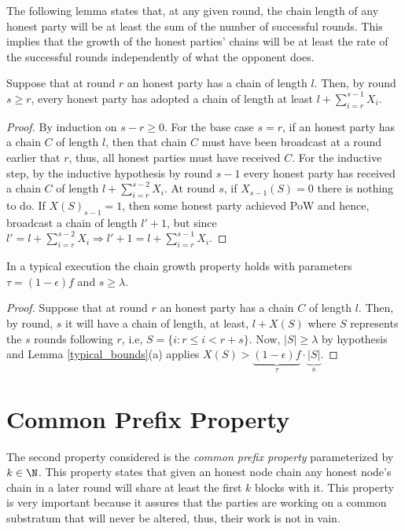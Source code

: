 \documentclass[..]{subfiles}
\begin{document}
The following lemma states that, at any given round, the chain length of any honest party will be at least the sum of the number of successful rounds. This implies that the growth of the honest parties' chains will be at least the rate of the successful rounds independently of what the opponent does.
\begin{lemma}\label{cg_lemma}
	Suppose that at round $r$ an honest party has a chain of length $l$. Then, by round $s \ge r$, every honest party has adopted a chain of length at least $l + \sum_{i=r}^{s-1}{X_i}$.
\end{lemma}
\begin{proof}
	By induction on $s-r \ge 0$. For the base case $s=r$, if an honest party has a chain $C$ of length $l$, then that chain $C$ must have been broadcast at a round earlier that $r$, thus, all honest parties must have received $C$.
	For the inductive step, by the inductive hypothesis by round $s-1$ every honest party has received a chain $C$ of length $l + \sum_{i=r}^{s-2}{X_i}$. At round $s$, if $X_{s-1}(S) = 0$ there is nothing to do. If $X(S)_{s-1} = 1$, then some honest party achieved PoW and hence, broadcast a chain of length $l' + 1$, but since $l' = l + \sum_{i=r}^{s-2}{X_i} \Rightarrow l' + 1 = l + \sum_{i=r}^{s-1}{X_i}$.
\end{proof}

\begin{theorem}
	In a typical execution the chain growth property holds with parameters $\tau = (1 - \epsilon)f$ and $s \ge \lambda$.
\end{theorem}
\begin{proof}
	Suppose that at round $r$ an honest party has a chain $C$ of length $l$. Then, by round, $s$ it will have a chain of length, at least, $l + X(S)$ where $S$ represents the $s$ rounds following $r$, i.e, $S = \{i: r \le i < r+s\}$. Now, $|S| \ge \lambda$ by hypothesis and Lemma \ref{typical_bounds}(a) applies $X(S) > \underbrace{(1-\epsilon)f}_\text{$\tau$} \cdot \underbrace{|S|}_\text{s}$.
\end{proof}




\section{Common Prefix Property}

The second property considered is the \textit{common prefix property} parameterized by $k \in \N$. This property states that given an honest node chain any honest node's chain in a later round will share at least the first $k$ blocks with it. This property is very important because it assures that the parties are working on a common substratum that will never be altered, thus, their work is not in vain. 
\end{document}
